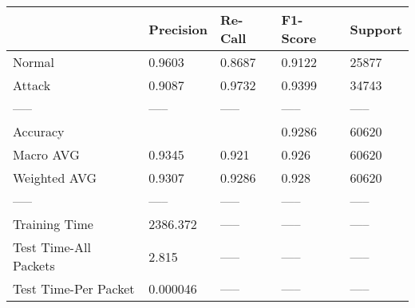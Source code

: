 \begin{tabular}{lllll}
\toprule
{} & Precision & Re-Call & F1-Score & Support \\
\midrule
Normal                &    0.9603 &  0.8687 &   0.9122 &   25877 \\
Attack                &    0.9087 &  0.9732 &   0.9399 &   34743 \\
-----                 &     ----- &   ----- &    ----- &   ----- \\
Accuracy              &           &         &   0.9286 &   60620 \\
Macro AVG             &    0.9345 &   0.921 &    0.926 &   60620 \\
Weighted AVG          &    0.9307 &  0.9286 &    0.928 &   60620 \\
-----                 &     ----- &   ----- &    ----- &   ----- \\
Training Time         &  2386.372 &   ----- &    ----- &   ----- \\
Test Time-All Packets &     2.815 &   ----- &    ----- &   ----- \\
Test Time-Per Packet  &  0.000046 &   ----- &    ----- &   ----- \\
\bottomrule
\end{tabular}
